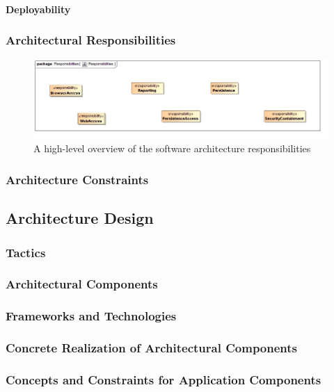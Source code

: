 \paragraph{Deployability}
\label{sec:systemDeployability}

\subsubsection{Architectural Responsibilities}
\begin{figure}[H]
	\begin{center}
	\includegraphics[scale=0.4]{../Diagrams and Charts/Architecture/Responsibilities.jpg}
	\caption{A high-level overview of the software architecture responsibilities}
	\end{center}
	\label{ref:architectureResponsibilities}
\end{figure}

\subsubsection{Architecture Constraints}

\subsection{Architecture Design}
\subsubsection{Tactics}
\subsubsection{Architectural Components}
\subsubsection{Frameworks and Technologies}
\subsubsection{Concrete Realization of Architectural Components}
\subsubsection{Concepts and Constraints for Application Components}


